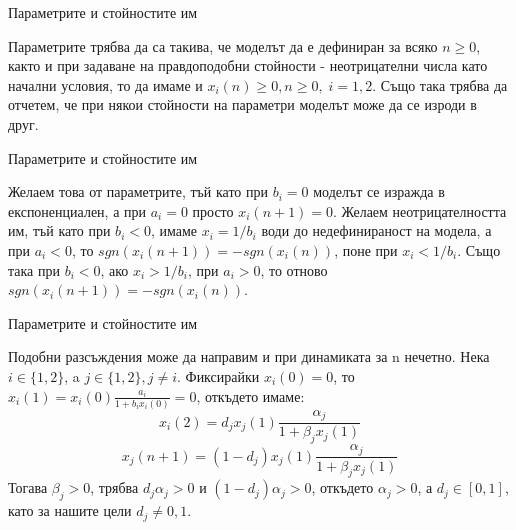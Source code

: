 
\begin{frame}[t]{Параметрите и стойностите им}

Параметрите трябва да са такива, че моделът да е дефиниран за всяко $n \geq 0$, както и при задаване на правдоподобни стойности - неотрицателни числа като начални условия, то да имаме и $x_{i}(n) \geq 0, n \geq 0, \; i=1,2$. Също така трябва да отчетем, че при някои стойности на параметри моделът може да се изроди в друг. 

\end{frame}


\begin{frame}[t]{Параметрите и стойностите им}

Желаем това от параметрите, тъй като при $b_{i}=0$ моделът се изражда в експоненциален, а при $a_{i}=0$ просто $x_{i}(n+1)=0$. Желаем неотрицателността им, тъй като при $b_{i} < 0$, имаме $x_{i} = 1/b_{i}$ води до недефинираност на модела, а при $a_{i} < 0 $, то $sgn(x_{i}(n+1)) = - sgn(x_{i}(n))$, поне при $x_{i} < 1/b_{i}$. Също така при $b_{i} < 0$, ако $x_{i} > 1/b_{i}$, при $a_{i} > 0 $, то отново $sgn(x_{i}(n+1)) = - sgn(x_{i}(n))$.

\end{frame}


\begin{frame}[t]{Параметрите и стойностите им}

Подобни разсъждения може да направим и при динамиката за n нечетно. Нека $i \in \{1, 2\}$, a $j \in \{1, 2\}, j \neq i$. Фиксирайки $x_{i}(0)=0$, то $x_{i}(1)=x_{i}(0)\frac{a_{i}}{1+b_{i} x_{i}(0)}=0$, откъдето имаме:
\[x_{i}(2)=d_{j} x_{j}(1)\frac{\alpha_{j}}{1+\beta_{j} x_{j}(1)}\]
\[x_{j}(n+1)=(1-d_{j}) x_{j}(1)\frac{\alpha_{j}}{1+\beta_{j} x_{j}(1)}\] Тогава $\beta_{j} > 0$, трябва $d_{j}\alpha_{j}>0$ и $(1-d_{j})\alpha_{j}>0$, откъдето $\alpha_{j}>0$, а $d_{j} \in [0,1]$, като за нашите цели $d_{j} \neq 0, 1$.

\end{frame}